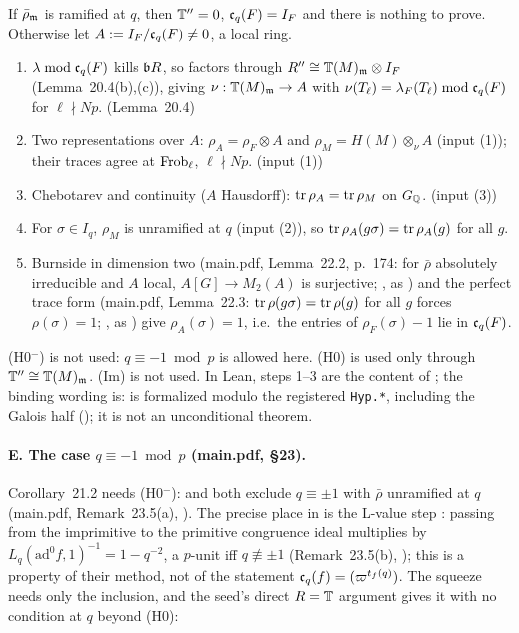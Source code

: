 \begin{outline}
If $\bar\rho_{\mathfrak{m}}$ is ramified at $q$, then $\mathbb{T}''=0$, $\mathfrak{c}_q(F)=I_F$ and there is nothing to prove. Otherwise let $A:=I_F/\mathfrak{c}_q(F)\ne0$, a local ring.
\begin{enumerate}[label=(\arabic*)]
\item $\lambda\bmod\mathfrak{c}_q(F)$ kills $\mathfrak{b} R$, so factors through $R''\cong\mathbb{T}(M)_{\mathfrak{m}}\otimes I_F$ (Lemma~20.4(b),(c)), giving $\nu:\mathbb{T}(M)_{\mathfrak{m}}\to A$ with
  $\nu(T_\ell)=\lambda_F(T_\ell)\bmod\mathfrak{c}_q(F)$ for $\ell\nmid Np$. \stpmc{} (Lemma~20.4)
\item Two representations over $A$: $\rho_A=\rho_F\otimes A$ and $\rho_M=H(M)\otimes_{\nu}A$ (input (1)); their traces agree at
  $\mathrm{Frob}_\ell$, $\ell\nmid Np$. \stcited{} (input (1))
\item Chebotarev and continuity ($A$ Hausdorff): $\operatorname{tr}\rho_A=\operatorname{tr}\rho_M$ on $G_{\mathbb{Q}}$. \stknown{} (input (3))
\item For $\sigma\in I_q$, $\rho_M$ is unramified at $q$ (input (2)), so $\operatorname{tr}\rho_A(g\sigma)=\operatorname{tr}\rho_A(g)$ for all $g$.
\item Burnside in dimension two (main.pdf, Lemma~22.2, p.~174: for $\bar\rho$ absolutely irreducible and $A$ local, $A[G]\to M_2(A)$ is
  surjective; \stproved, \stformal{} as ) and the perfect trace form (main.pdf,
  Lemma~22.3: $\operatorname{tr}\rho(g\sigma)=\operatorname{tr}\rho(g)$ for all $g$ forces $\rho(\sigma)=1$; \stproved, \stformal{} as
  ) give $\rho_A(\sigma)=1$, i.e.\ the entries of $\rho_F(\sigma)-1$ lie in $\mathfrak{c}_q(F)$.
\end{enumerate}
(H0$^-$) is not used: $q\equiv-1\bmod p$ is allowed here. (H0) is used only through $\mathbb{T}''\cong\mathbb{T}(M)_{\mathfrak{m}}$. (Im) is not used. In Lean, steps
1--3 are the content of ; the binding wording is:  is formalized modulo the
registered \texttt{Hyp.*}, including the Galois half (); it is not an unconditional theorem.
\end{outline}

\paragraph{E. The case $q\equiv-1\bmod p$ (main.pdf, \S23).} Corollary~21.2 needs (H0$^-$): \cite[Thm~1.1(6)]{KO} and \cite[(CR)(2)]{PW}
both exclude $q\equiv\pm1$ with $\bar\rho$ unramified at $q$ (main.pdf, Remark~23.5(a), \stcited). The precise place in \cite{KO} is the
L-value step \cite[Prop.~2.15(1), p.~8]{KO}: passing from the imprimitive to the primitive congruence ideal multiplies by
$L_q(\mathrm{ad}^0f,1)^{-1}=1-q^{-2}$, a $p$-unit iff $q\not\equiv\pm1$ (Remark~23.5(b), \stcited); this is a property of their method, not of
the statement $\mathfrak{c}_q(f)=(\varpi^{t_f(q)})$. The squeeze needs only the inclusion, and the seed's direct $R=\mathbb{T}$ argument gives it with no
condition at $q$ beyond (H0):

